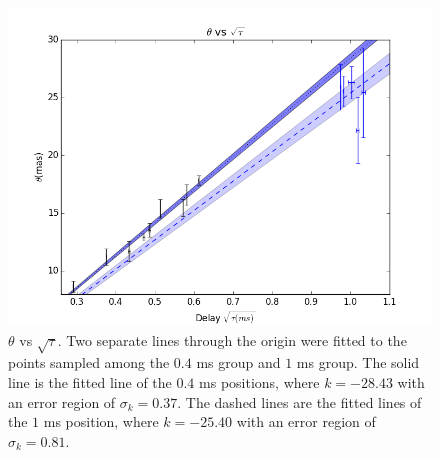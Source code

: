 \documentclass[useAMS,usenatbib]{mn2e}
\begin{document}

\begin{figure}
\centering
\includegraphics[width=1.0\linewidth, angle=0]{Theta_tau.png}
\caption{${\theta}$ vs ${\sqrt{\tau}}$. Two separate lines through the origin were fitted to the points sampled among the $0.4$ ms group and $1$ ms group. The solid line is the fitted line of the $0.4$ ms positions, where $k=-28.43$ with an error region of $\sigma_k=0.37$. The dashed lines are the fitted lines of the $1$ ms position, where $k=-25.40$ with an error region of $\sigma_k=0.81$.
}
\label{thetatau}
\end{figure}


\end{document}
